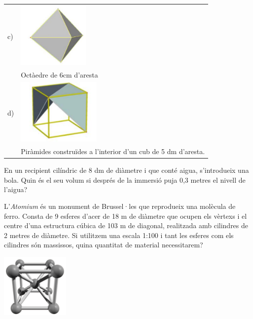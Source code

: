 \begin{activitats}
\begin{mylist}
\begin{center}
\begin{tabular}{p{1cm}p{4cm}}
		c) &  \includegraphics[height=3.2cm]{img-11/88c} \\ & Octàedre de 6cm d'aresta \\
		
		
		d) &  \includegraphics[height=3.2cm]{img-11/88d} \\ & Piràmides construïdes a l'interior d'un cub de 5 dm d'aresta. \\
	\end{tabular}
\end{center}

\answers[cols=1]{[$A=274.45$ cm$^2$; $V=326.6$ cm$^3$,  
				$A=162.06$ cm$^2$; $V=116.64$ cm$^3$, 
				$A=124.71$ cm$^2$; $V=101.82$ cm$^3$, 
				$A=59.15$ dm$^2$; $V=41.6$ dm$^3$]}

\exer  En un recipient cilíndric de 8 dm de diàmetre i que conté aigua, s'introdueix una bola. Quin és el seu volum si després de la immersió puja 0,3 metres el nivell de l'aigua?


\exer  L'\textit{Atomium} és un monument de Brussel·les que reprodueix una molècula de ferro. Consta de 9 esferes d'acer de 18 m de diàmetre que ocupen els vèrtexs i el centre d'una estructura cúbica de 103 m de diagonal, realitzada amb cilindres de 2 metres de diàmetre. Si utilitzem una escala 1:100 i tant les esferes com els cilindres són massissos, quina quantitat de material necessitarem? 
\begin{center}
	\includegraphics[width=0.25\textwidth]{img-11/atomium}
\end{center}


\end{mylist}
\end{activitats}
